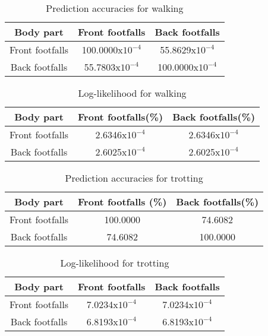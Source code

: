\begin{table}[h!] 
	\centering
	\begin{tabular}{ |c|c|c|} 	
		\hline	
		\textbf{Body part} & \textbf{Front footfalls} &  \textbf{Back footfalls}\\ 
		\hline
		Front footfalls &  100.0000x\(10^{-4}\) & 55.8629x\(10^{-4}\)\\ 
		\hline
		Back footfalls & 55.7803x\(10^{-4}\) & 100.0000x\(10^{-4}\) \\ 
		\hline	   	
	\end{tabular}
	\caption{Prediction accuracies for walking}
	\label{tab:front-back-walk-acc}
\end{table}

\begin{table}[h!] 
	\centering
	\begin{tabular}{ |c|c|c|} 	
		\hline	
		\textbf{Body part} & \textbf{Front footfalls(\%)} &  \textbf{Back footfalls(\%)}\\ 
		\hline
		Front footfalls & 2.6346x\(10^{-4}\) & 2.6346x\(10^{-4}\)\\ 
		\hline
		Back footfalls & 2.6025x\(10^{-4}\) & 2.6025x\(10^{-4}\)\\ 
		\hline	   	
	\end{tabular}
	\caption{Log-likelihood for walking}
	\label{tab:front-back-walk-log}
\end{table}


\begin{table}[h!] 
	\centering
	\begin{tabular}{ |c|c|c|} 	
		\hline	
		\textbf{Body part} & \textbf{Front footfalls (\%)} &  \textbf{Back footfalls(\%)}\\ 
		\hline
		Front footfalls &  100.0000 & 74.6082\\ 
		\hline
		Back footfalls & 74.6082 & 100.0000 \\ 
		\hline	   	
	\end{tabular}
	\caption{Prediction accuracies for trotting}
	\label{tab:front-back-trot-acc}
\end{table}


\begin{table}[h!] 
	\centering
	\begin{tabular}{ |c|c|c|} 	
		\hline	
		\textbf{Body part} & \textbf{Front footfalls} &  \textbf{Back footfalls}\\ 
		\hline
		Front footfalls & 7.0234x\(10^{-4}\) & 7.0234x\(10^{-4}\)\\ 
		\hline
		Back footfalls & 6.8193x\(10^{-4}\) & 6.8193x\(10^{-4}\)\\ 
		\hline	   	
	\end{tabular}
	\caption{Log-likelihood for trotting}
	\label{tab:front-back-trot-log}
\end{table}

